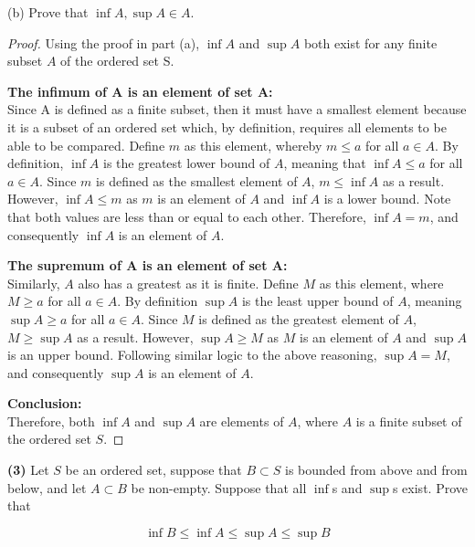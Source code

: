 \documentclass[12pt]{article}
\begin{document}
\newpage

\indent(b) Prove that $\inf A, \sup A \in A$. 

\begin{proof}
Using the proof in part (a), $\inf A$ and $\sup A$ both exist for any finite subset $A$ of the ordered set S.

\textbf{The infimum of A is an element of set A:} \\
Since A is defined as a finite subset, then it must have a smallest element because it is a subset of an ordered set which, by definition, requires all elements to be able to be compared. Define $m$ as this element, whereby $m\le a$ for all $a\in A$. By definition, $\inf A$ is the greatest lower bound of $A$, meaning that $\inf A \le a$ for all $a\in A$. Since $m$ is defined as the smallest element of $A$, $m\le \inf A$ as a result. However, $\inf A \le m$ as $m$ is an element of $A$ and $\inf A$ is a lower bound. Note that both values are less than or equal to each other. Therefore, $\inf A = m$, and consequently $\inf A$ is an element of $A$.

\textbf{The supremum of A is an element of set A:} \\
Similarly, $A$ also has a greatest as it is finite. Define $M$ as this element, where $M\ge a$ for all $a\in A$. By definition $\sup A$ is the least upper bound of $A$, meaning $\sup A\ge a$ for all $a\in A$. Since $M$ is defined as the greatest element of $A$, $M\ge \sup A$ as a result. However, $\sup A\ge M$ as $M$ is an element of $A$ and $\sup A$ is an upper bound. Following similar logic to the above reasoning, $\sup A = M$, and consequently $\sup A$ is an element of $A$.

\textbf{Conclusion:} \\
Therefore, both $\inf A$ and $\sup A$ are elements of $A$, where $A$ is a finite subset of the ordered set $S$.
\end{proof}

\newpage

\noindent \textbf{(3)} Let $S$ be an ordered set, suppose that $B \subset S$ is bounded from above and from below, and let $A \subset B$ be non-empty. Suppose that all $\inf$s and $\sup$s exist. Prove that

\begin{equation*}
	\inf B \le \inf A \le \sup A \le \sup B
\end{equation*}
\end{document}
